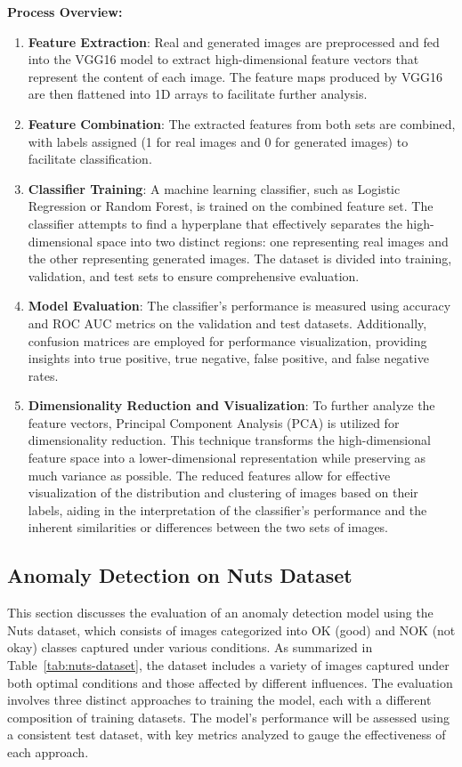 \documentclass[12pt,DIV14,BCOR12mm,a4paper,footinclude=false,headinclude,parskip=half-,twoside,openright,cleardoublepage=empty,toc=index,bibliography=totoc,listof=totoc]{scrreprt}
\numberwithin{equation}{chapter}
\begin{document}
\textbf{Process Overview:}
\begin{enumerate}
    \item \textbf{Feature Extraction}: Real and generated images are preprocessed and fed into the VGG16 model to extract high-dimensional feature vectors that represent the content of each image. The feature maps produced by VGG16 are then flattened into 1D arrays to facilitate further analysis.

    \item \textbf{Feature Combination}: The extracted features from both sets are combined, with labels assigned (1 for real images and 0 for generated images) to facilitate classification.

    \item \textbf{Classifier Training}: A machine learning classifier, such as Logistic Regression or Random Forest, is trained on the combined feature set. The classifier attempts to find a hyperplane that effectively separates the high-dimensional space into two distinct regions: one representing real images and the other representing generated images. The dataset is divided into training, validation, and test sets to ensure comprehensive evaluation.

    \item \textbf{Model Evaluation}: The classifier's performance is measured using accuracy and ROC AUC metrics on the validation and test datasets. Additionally, confusion matrices are employed for performance visualization, providing insights into true positive, true negative, false positive, and false negative rates.

    \item \textbf{Dimensionality Reduction and Visualization}: To further analyze the feature vectors, Principal Component Analysis (PCA) is utilized for dimensionality reduction. This technique transforms the high-dimensional feature space into a lower-dimensional representation while preserving as much variance as possible. The reduced features allow for effective visualization of the distribution and clustering of images based on their labels, aiding in the interpretation of the classifier's performance and the inherent similarities or differences between the two sets of images.
\end{enumerate}

\subsection{Anomaly Detection on Nuts Dataset}
This section discusses the evaluation of an anomaly detection model using the Nuts dataset, which consists of images categorized into OK (good) and NOK (not okay) classes captured under various conditions. As summarized in Table~\ref{tab:nuts-dataset}, the dataset includes a variety of images captured under both optimal conditions and those affected by different influences. The evaluation involves three distinct approaches to training the model, each with a different composition of training datasets. The model's performance will be assessed using a consistent test dataset, with key metrics analyzed to gauge the effectiveness of each approach.
\end{document}
